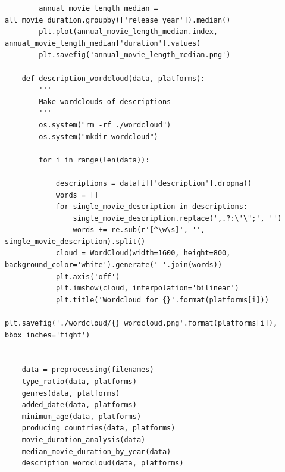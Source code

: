 \documentclass{article}
\begin{document}
\begin{verbatim}
		annual_movie_length_median = all_movie_duration.groupby(['release_year']).median()
		plt.plot(annual_movie_length_median.index, annual_movie_length_median['duration'].values)
		plt.savefig('annual_movie_length_median.png')
		
	def description_wordcloud(data, platforms):
		'''
		Make wordclouds of descriptions 
		'''
		os.system("rm -rf ./wordcloud")
		os.system("mkdir wordcloud")
	
		for i in range(len(data)):
			
			descriptions = data[i]['description'].dropna()
			words = []
			for single_movie_description in descriptions:
				single_movie_description.replace(',.?:\'\";', '')
				words += re.sub(r'[^\w\s]', '', single_movie_description).split()
			cloud = WordCloud(width=1600, height=800, background_color='white').generate(' '.join(words))
			plt.axis('off')
			plt.imshow(cloud, interpolation='bilinear')
			plt.title('Wordcloud for {}'.format(platforms[i]))
			plt.savefig('./wordcloud/{}_wordcloud.png'.format(platforms[i]), bbox_inches='tight')
	
	
	data = preprocessing(filenames)
	type_ratio(data, platforms)
	genres(data, platforms)
	added_date(data, platforms)
	minimum_age(data, platforms)
	producing_countries(data, platforms)
	movie_duration_analysis(data)
	median_movie_duration_by_year(data)
	description_wordcloud(data, platforms)
\end{verbatim}
	
\end{document}
